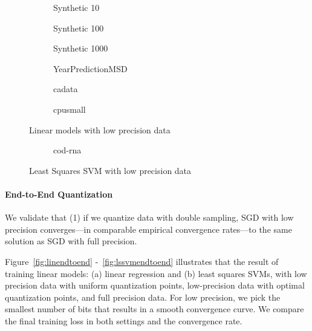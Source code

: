 \documentclass{article}
\begin{document}
\begin{figure}[t]
\centering
    \begin{subfigure}[h]{.3\columnwidth}
    \caption{Synthetic 10}
    \end{subfigure}
    \begin{subfigure}[h]{.3\columnwidth}
    \caption{Synthetic 100}
    \end{subfigure}
    \begin{subfigure}[h]{.3\columnwidth}
     \caption{Synthetic 1000}
    \end{subfigure}
    
    \begin{subfigure}[h]{.3\columnwidth}
    \caption{YearPredictionMSD}
    \end{subfigure}
    \begin{subfigure}[h]{.3\columnwidth}
    \caption{cadata}
    \end{subfigure}
    \begin{subfigure}[h]{.3\columnwidth}
     \caption{cpusmall}
    \end{subfigure}
    
\caption{Linear models with low precision data}
\label{fig:lindata}
\end{figure}


\begin{figure}[t]
\centering
    \begin{subfigure}[h]{.4\columnwidth}
    \caption{cod-rna}
    \end{subfigure}
    
\caption{Least Squares SVM with low precision data}
\label{fig:lssvmdata}
\end{figure}

\paragraph{End-to-End Quantization}
We validate that (1) if we quantize data with double sampling, SGD with low precision converges---in comparable empirical 
convergence rates---to the same solution as SGD with full precision.

Figure~\ref{fig:linendtoend} -~\ref{fig:lssvmendtoend} illustrates that the result of training linear models:
(a) linear regression and (b) least squares SVMs,
with low precision data with uniform quantization points, low-precision data with optimal quantization points, and 
full precision data. For low precision, we pick the 
smallest number of bits that results in a smooth convergence
curve. We compare the final training loss in both settings and the convergence rate.
\end{document}

